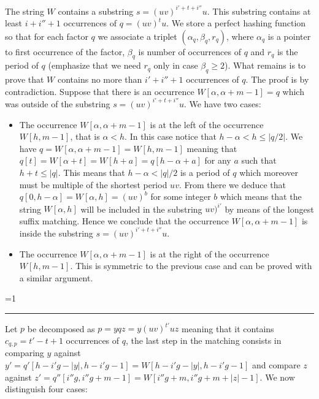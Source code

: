 \documentclass{article}
\newcommand{\?}{\mskip1.5mu}
\newcounter{noqed}
\newcommand{\qed}{ \ifmmode\mbox{
}\fi\rule[-.05em]{.3em}{.7em}\setcounter{noqed}{0}}
\newenvironment{proof}[1][{}]{\noindent{\bf Proof#1.
}\setcounter{noqed}{1}}{\ifnum\value{noqed}=1\qed\fi\par\medskip}
\begin{document}
\begin{proof}
The string $W$ contains a substring $s=(uv)^{i'+t+i''}u$. This substring contains at least $i+i''+1$ occurrences of $q=(uv)^tu$. We store a perfect hashing function so that for each factor $q$ we associate a triplet $(\alpha_q,\beta_q,r_q)$, where $\alpha_q$ is a pointer to first occurrence of the factor, $\beta_q$ is number of occurrences of $q$ and $r_q$ is the period of $q$ (emphasize that we need $r_q$ only in case $\beta_q\geq 2$). 
What remains is to prove that $W$ contains no more than $i'+i''+1$ occurrences of $q$. The proof is by contradiction. Suppose that there is an occurrence $W[\alpha,\alpha+m-1]=q$ which was outside of the substring $s=(uv)^{i'+t+i''}u$. We have two cases:
\begin{itemize}
\item The occurrence $W[\alpha,\alpha+m-1]$ is at the left of the occurrence $W[h,m-1]$, that is $\alpha<h$. In this case notice that $h-\alpha<h\leq|q/2|$. We have $q=W[\alpha,\alpha+m-1]=W[h,m-1]$ meaning that $q[t]=W[\alpha+t]=W[h+a]=q[h-\alpha+a]$ for any $a$ such that $h+t\leq |q|$. This means that $h-\alpha<|q|/2$ is a period of $q$ which moreover must be multiple of the shortest period $uv$. From there we deduce that $q[0,h-\alpha]=W[\alpha,h]=(uv)^b$ for some integer $b$ which means that the string $W[\alpha,h]$ will be included in the substring $uv)^{i'}$ by means of the longest suffix matching. Hence we conclude that the occurrence  $W[\alpha,\alpha+m-1]$ is inside the substring $s=(uv)^{i'+t+i''}u$. 
\item The occurrence $W[\alpha,\alpha+m-1]$ is at the right of the occurrence $W[h,m-1]$. This is symmetric to the previous case and can be proved with a similar argument. 
\end{itemize}
\end{proof}
Let $p$ be decomposed as $p=yqz=y(uv)^{t'}uz$ meaning that it contains $c_{q,p}=t'-t+1$ occurrences of $q$, the last step in the matching consists in comparing $y$ against $y'=q'[h-i'g-|y|,h-i'g-1]=W[h-i'g-|y|,h-i'g-1]$ and compare $z$ against $z'=q''[i''g,i''g+m-1]=W[i''g+m,i''g+m+|z|-1]$. We now distinguish four cases: 
\end{document}
